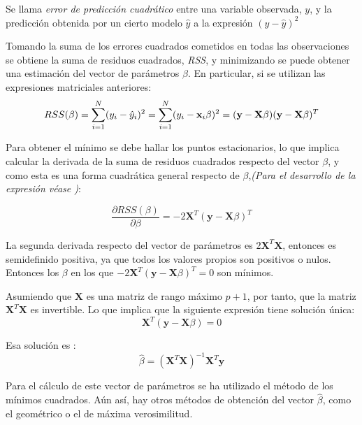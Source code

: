 \begin{defi}
Se llama \emph{error de predicción cuadrático} entre una variable observada, $y$, y la predicción obtenida por un cierto modelo $\hat{y}$ a la expresión $(y-\hat{y})^2$
\end{defi}

\noindent Tomando la suma de los errores cuadrados cometidos  en todas las observaciones se obtiene la suma de residuos cuadrados, \emph{RSS}, y minimizando se puede obtener una estimación del vector de parámetros $\beta$. En particular, si se utilizan las expresiones matriciales  anteriores:
\begin{equation}
RSS(\beta)=\sum_{i=1}^N(y_i-\hat{y}_i)^2 = \sum_{i=1}^N(y_i-\textbf{x}_i\beta)^2=(\textbf{y}-\textbf{X}\beta)(\textbf{y}-\textbf{X}\beta)^T\\
\end{equation}

\noindent Para obtener el mínimo se debe hallar los puntos estacionarios, lo que implica calcular la derivada de la suma de residuos cuadrados respecto del vector $\beta$, y como esta es una forma cuadrática general respecto de $\beta$,\emph{(Para el desarrollo de la expresión véase \cite{Morrison 1976})}:

\begin{equation}
\dfrac{\partial RSS(\beta)}{\partial \beta}= -2\mathbf{X}^T(\mathbf{y}-\mathbf{X}\beta)^T
\end{equation}

\noindent La segunda derivada respecto del vector de parámetros es $2\mathbf{X}^T\mathbf{X}$, entonces es  semidefinido positiva, ya que todos los valores propios son positivos o nulos. Entonces los $\beta$ en los que $-2\mathbf{X}^T(\mathbf{y}-\mathbf{X}\beta)^T=0$ son mínimos.  

\noindent Asumiendo que $\textbf{X}$ es una matriz de rango máximo $p+1$, por tanto, que la matriz $\mathbf{X}^T \mathbf{X}$ es invertible. Lo que implica que la siguiente expresión tiene solución única: 
\begin{equation}
\textbf{X}^T(\textbf{y}-\textbf{X}\beta)=0
\end{equation}

\noindent Esa solución es :
\begin{equation}
\hat{\beta}=(\textbf{X}^T\textbf{X})^{-1}\textbf{X}^T\textbf{y}
\end{equation}

\noindent Para el cálculo de este vector de parámetros se ha utilizado el método de los mínimos cuadrados. Aún así, hay otros métodos de obtención del vector $\hat{\beta}$, como el geométrico o el de máxima verosimilitud. 


